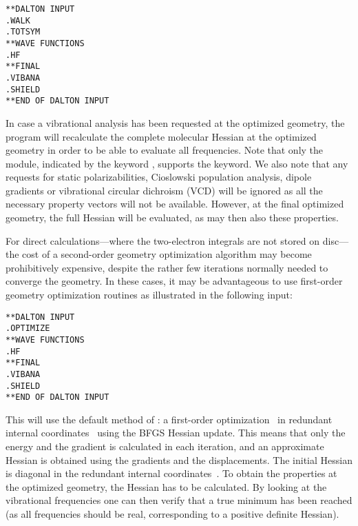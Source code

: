 \begin{verbatim}
**DALTON INPUT
.WALK
.TOTSYM
**WAVE FUNCTIONS
.HF
**FINAL
.VIBANA
.SHIELD
**END OF DALTON INPUT
\end{verbatim}

In case a vibrational analysis has been requested at the optimized
geometry, the program will recalculate the complete molecular Hessian
at the optimized geometry in order to be able to evaluate all
frequencies. Note that only the  module, indicated by the
keyword , supports the  keyword.
We also note that any requests for static
polarizabilities, Cioslowski population
analysis, dipole 
gradients or vibrational circular dichroism
(VCD) will be ignored
as all the necessary property vectors will not be available. However,
at the final optimized geometry, the full Hessian will be evaluated,
as may then also these properties.

For direct calculations---where the
two-electron integrals are not stored on disc---the cost of a
second-order geometry optimization algorithm may become
prohibitively expensive, despite the rather few iterations normally
needed to converge the geometry. In these cases, it may be
advantageous to use first-order geometry
optimization routines as illustrated in the following input:

\begin{verbatim}
**DALTON INPUT
.OPTIMIZE
**WAVE FUNCTIONS
.HF
**FINAL
.VIBANA
.SHIELD
**END OF DALTON INPUT
\end{verbatim}

This will use the default method of : a first-order
optimization~\cite{Fletcher} in redundant internal
coordinates~\cite{gfxfzpwtppjacs114,ppgfjcp96,vbth}
using the BFGS
Hessian update. This means that
only the energy and the gradient is calculated in each iteration, and
an approximate Hessian is obtained using the gradients and the
displacements. The initial Hessian is diagonal in the redundant
internal coordinates~\cite{rlabgkpamcpl241}.
To obtain the properties at the optimized 
geometry, the Hessian has to be calculated. By looking at the
vibrational frequencies one can then verify that a true minimum has
been reached (as all frequencies should be real, corresponding to a
positive definite Hessian).


